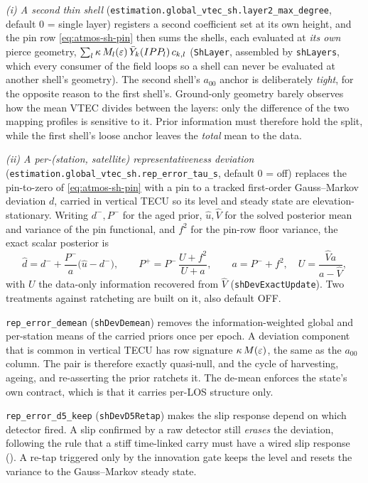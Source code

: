 \documentclass[main.tex]{subfiles}
\begin{document}
\emph{(i) A second thin shell}
(\texttt{estimation.global\_vtec\_sh.layer2\_max\_degree}, default $0$ =
single layer) registers a second coefficient set at its own height, and the
pin row \eqref{eq:atmos-sh-pin} then sums the shells, each evaluated at
\emph{its own} pierce geometry, $\sum_l \kappa\,M_l(\varepsilon)\,\bar
Y_k(IPP_l)\,c_{k,l}$ (\texttt{ShLayer}, assembled by
\texttt{shLayers}, which every consumer of the field loops so a shell can
never be evaluated at another shell's geometry).  The second shell's
$a_{00}$ anchor is deliberately \emph{tight}, for the opposite reason to
the first shell's.  Ground-only geometry barely observes how the mean
VTEC divides between the layers: only the difference of the two mapping
profiles is sensitive to it.  Prior information must therefore hold the
split, while the first shell's loose anchor leaves the \emph{total} mean
to the data.

\emph{(ii) A per-(station, satellite) representativeness deviation}
(\texttt{estimation.global\_vtec\_sh.rep\_error\_tau\_s}, default $0$ = off)
replaces the pin-to-zero of \eqref{eq:atmos-sh-pin} with a pin to a tracked
first-order Gauss--Markov deviation $d$, carried in vertical TECU so its
level and steady state are elevation-stationary.  Writing $d^-, P^-$ for the
aged prior, $\hat u, \hat V$ for the solved posterior mean and variance of
the pin functional, and $f^2$ for the pin-row floor variance, the exact
scalar posterior is
\begin{equation}
\hat d = d^- + \frac{P^-}{a}\bigl(\hat u - d^-\bigr),
\qquad
P^{+} = P^-\,\frac{U + f^2}{U + a},
\qquad
a = P^- + f^2,
\quad
U = \frac{\hat V a}{a - \hat V},
\label{eq:atmos-sh-dev}
\end{equation}
with $U$ the data-only information recovered from $\hat V$
(\texttt{shDevExactUpdate}).  Two treatments against ratcheting are built
on it, also default OFF.

\texttt{rep\_error\_demean} (\texttt{shDevDemean}) removes the
information-weighted global and per-station means of the carried priors
once per epoch.  A deviation component that is common in vertical TECU
has row signature $\kappa\,M(\varepsilon)$, the same as the $a_{00}$ column.
The pair is therefore exactly quasi-null, and the cycle of harvesting,
ageing, and re-asserting the prior ratchets it.  The de-mean enforces
the state's own contract, which is that it carries per-LOS structure
only.

\texttt{rep\_error\_d5\_keep} (\texttt{shDevD5Retap}) makes the slip
response depend on which detector fired.  A slip confirmed by a raw
detector still \emph{erases} the deviation, following the rule that a
stiff time-linked carry must have a wired slip response
().  A re-tap triggered only by
the innovation gate keeps the level and resets the variance to the
Gauss--Markov steady state.
\end{document}

